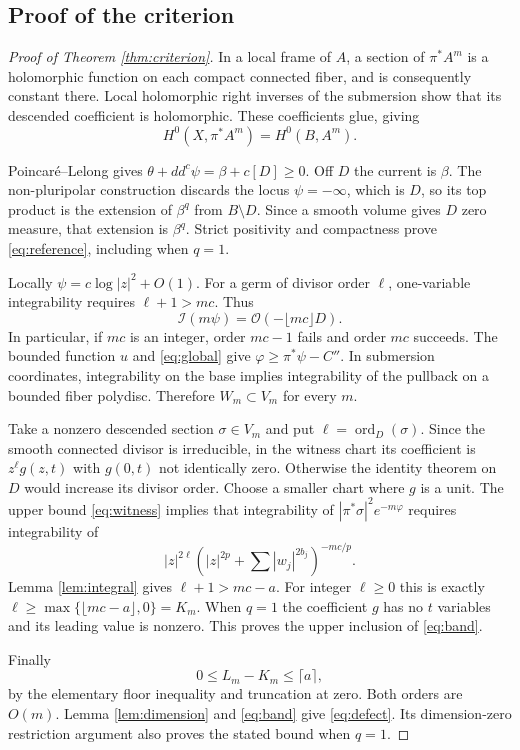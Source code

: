 \documentclass[11pt]{article}
\newcommand{\ddc}{dd^c}
\newcommand{\cI}{\mathcal I}
\newcommand{\cO}{\mathcal O}
\newcommand{\ord}{\operatorname{ord}}
\begin{document}
\subsection{Proof of the criterion}
\begin{proof}[Proof of Theorem \ref{thm:criterion}]
In a local frame of $A$, a section of $\pi^*A^m$ is a holomorphic function
on each compact connected fiber, and is consequently constant there. Local
holomorphic right inverses of the submersion show that its descended
coefficient is holomorphic. These coefficients glue, giving
\[
 H^0(X,\pi^*A^m)=H^0(B,A^m).
\]

Poincar\'e--Lelong gives
$\theta+\ddc\psi=\beta+c[D]\geq0$. Off $D$ the current is $\beta$.
The non-pluripolar construction discards the locus $\psi=-\infty$, which
is $D$, so its top product is the extension of $\beta^q$ from $B\setminus D$.
Since a smooth volume gives $D$ zero measure, that extension is $\beta^q$.
Strict positivity and compactness prove \eqref{eq:reference}, including
when $q=1$.

Locally $\psi=c\log|z|^2+O(1)$. For a germ of divisor order $\ell$,
one-variable integrability requires $\ell+1>mc$. Thus
\[
 \cI(m\psi)=\cO(-\lfloor mc\rfloor D).
\]
In particular, if $mc$ is an integer, order $mc-1$ fails and order $mc$
succeeds. The bounded function $u$ and \eqref{eq:global} give
$\varphi\geq\pi^*\psi-C''$. In submersion coordinates, integrability
on the base implies integrability of the pullback on a bounded fiber
polydisc. Therefore $W_m\subset V_m$ for every $m$.

Take a nonzero descended section $\sigma\in V_m$ and put
$\ell=\ord_D(\sigma)$. Since the smooth connected divisor is irreducible,
in the witness chart its coefficient is $z^\ell g(z,t)$ with $g(0,t)$
not identically zero. Otherwise the identity theorem on $D$ would increase
its divisor order. Choose a smaller chart where $g$ is a unit.
The upper bound \eqref{eq:witness} implies that integrability of
$|\pi^*\sigma|^2e^{-m\varphi}$ requires integrability of
\[
 |z|^{2\ell}\left(|z|^{2p}+\sum|w_j|^{2b_j}\right)^{-mc/p}.
\]
Lemma \ref{lem:integral} gives $\ell+1>mc-a$. For integer $\ell\geq0$
this is exactly $\ell\geq\max\{\lfloor mc-a\rfloor,0\}=K_m$.
When $q=1$ the coefficient $g$ has no $t$ variables and its leading value
is nonzero. This proves the upper inclusion of \eqref{eq:band}.

Finally
\[
 0\leq L_m-K_m\leq\lceil a\rceil,
\]
by the elementary floor inequality and truncation at zero. Both orders
are $O(m)$. Lemma \ref{lem:dimension} and \eqref{eq:band} give
\eqref{eq:defect}. Its dimension-zero restriction argument also proves the
stated bound when $q=1$.
\end{proof}
\end{document}
